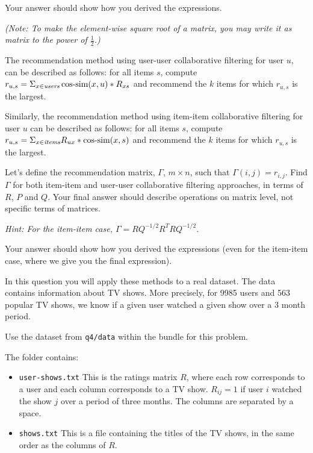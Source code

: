 Your answer should show how you derived the expressions.

\textit{(Note: To make the element-wise square root of a matrix, you may write it as matrix to the power of $\frac{1}{2}$.)}


The recommendation method using user-user collaborative filtering for user $u$, can be
described as follows: for all items $s$, compute $r_{u,s}=\Sigma_{x \in
\textit{users}}\operatorname{cos-sim}(x,u)*R_{xs}$ and recommend the $k$ items for which
$r_{u,s}$ is the largest.

Similarly, the recommendation method using item-item collaborative filtering for user $u$ can
be described as follows: for all items $s$, compute $r_{u,s}=\Sigma_{x \in
\textit{items}}R_{ux}*\operatorname{cos-sim}(x,s)$ and recommend the $k$ items for which $r_{u,s}$ is the largest.

Let's define the recommendation matrix, $\Gamma$, $m \times n$, such that
$\Gamma(i,j) = r_{i,j}$. Find $\Gamma$ for both item-item and user-user
collaborative filtering approaches, in terms of $R$, $P$ and $Q$. Your final answer should describe operations on matrix level, not specific terms of matrices. 

{\em Hint: For the item-item case, $\Gamma = RQ^{-1/2} R^TRQ^{-1/2}$.}

Your answer should show how you derived the expressions (even for the item-item case,
where we give you the final expression).

 In this question you will apply these methods to a real dataset. The data contains information about TV shows. More precisely, for 9985 users and 563 popular TV shows, we know if a given user watched a given show over a 3 month
period.

Use the dataset from \texttt{q4/data} within the bundle for this problem.

The folder contains:
\begin{itemize}
\item{\verb+user-shows.txt+} This is the ratings matrix $R$, where each row corresponds to a
user and each column corresponds to a TV show. $R_{ij} = 1$ if user $i$ watched the show
$j$ over a period of three months. The columns are separated by a space.
\item{\verb+shows.txt+} This is a file containing the titles of the TV shows, in the
same order as the columns of $R$.
\end{itemize}

